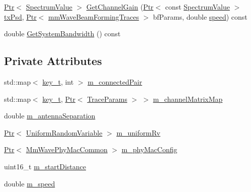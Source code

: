 \begin{DoxyCompactItemize}
\item 
\hyperlink{classns3_1_1Ptr}{Ptr}$<$ \hyperlink{classns3_1_1SpectrumValue}{Spectrum\+Value} $>$ \hyperlink{classns3_1_1MmWaveChannelRaytracing_acddfc590166e32ed64faff5b6673c951}{Get\+Channel\+Gain} (\hyperlink{classns3_1_1Ptr}{Ptr}$<$ const \hyperlink{classns3_1_1SpectrumValue}{Spectrum\+Value} $>$ \hyperlink{lte__link__budget__x2__handover__measures_8m_a684fe3101a5e48a5fcc57cab8dbcd1aa}{tx\+Psd}, \hyperlink{classns3_1_1Ptr}{Ptr}$<$ \hyperlink{structns3_1_1mmWaveBeamFormingTraces}{mm\+Wave\+Beam\+Forming\+Traces} $>$ bf\+Params, double \hyperlink{mmwave-amc-test_8cc_a6dc6e6f3c75c509ce943163afb5dade7}{speed}) const 
\item 
double \hyperlink{classns3_1_1MmWaveChannelRaytracing_a4b1cda4eb5073b8c715d5f89a35ba180}{Get\+System\+Bandwidth} () const 
\end{DoxyCompactItemize}
\subsection*{Private Attributes}
\begin{DoxyCompactItemize}
\item 
std\+::map$<$ \hyperlink{namespacens3_aa42bd408e172586b3b192acfaa36b070}{key\+\_\+t}, int $>$ \hyperlink{classns3_1_1MmWaveChannelRaytracing_a51c4346d4884ef3b8b08667ab6ca790d}{m\+\_\+connected\+Pair}
\item 
std\+::map$<$ \hyperlink{namespacens3_aa42bd408e172586b3b192acfaa36b070}{key\+\_\+t}, \hyperlink{classns3_1_1Ptr}{Ptr}$<$ \hyperlink{structns3_1_1TraceParams}{Trace\+Params} $>$ $>$ \hyperlink{classns3_1_1MmWaveChannelRaytracing_abdee4d8795a80d738563c52ec233cfdd}{m\+\_\+channel\+Matrix\+Map}
\item 
double \hyperlink{classns3_1_1MmWaveChannelRaytracing_a2767e831325c65376c59d1fb277d7944}{m\+\_\+antenna\+Separation}
\item 
\hyperlink{classns3_1_1Ptr}{Ptr}$<$ \hyperlink{classns3_1_1UniformRandomVariable}{Uniform\+Random\+Variable} $>$ \hyperlink{classns3_1_1MmWaveChannelRaytracing_a13ab4f0642dccc8758a20e0418cd7b16}{m\+\_\+uniform\+Rv}
\item 
\hyperlink{classns3_1_1Ptr}{Ptr}$<$ \hyperlink{classns3_1_1MmWavePhyMacCommon}{Mm\+Wave\+Phy\+Mac\+Common} $>$ \hyperlink{classns3_1_1MmWaveChannelRaytracing_a7782dd5b891e4cffae9024b271960891}{m\+\_\+phy\+Mac\+Config}
\item 
uint16\+\_\+t \hyperlink{classns3_1_1MmWaveChannelRaytracing_a796e2c26275e231a09c4049cf8af289d}{m\+\_\+start\+Distance}
\item 
double \hyperlink{classns3_1_1MmWaveChannelRaytracing_a318db9adde133cf62fd929bbd3b2b62e}{m\+\_\+speed}
\end{DoxyCompactItemize}
